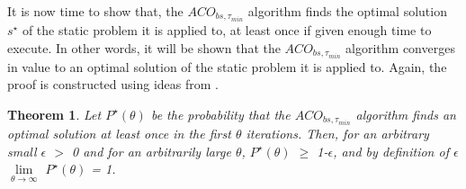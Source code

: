 \documentclass[12pt]{article}
\newtheorem{theorem}[definition]{Theorem}
\numberwithin{equation}{subsection}
\numberwithin{table}{subsection}
\numberwithin{algorithm}{subsection}
\numberwithin{figure}{subsection}
\begin{document}
It is now time to show that, the $ACO_{bs, \tau_{min}}$ algorithm finds the optimal solution $s^\star$ of the static problem it is applied to, at least once if given enough time to execute. In other words, it will be shown that the $ACO_{bs, \tau_{min}}$ algorithm converges in value to an optimal solution of the static problem it is applied to. Again, the proof is constructed using ideas from  \cite{dorigo_stutzle_thomas_2004}.
\begin{theorem}
\label{main_thrm}
Let $P^\star(\theta)$ be the probability that the $ACO_{bs, \tau_{min}}$ algorithm finds an optimal solution at least once in the first $\theta$ iterations. Then, for an arbitrary small $\epsilon$ $>$ 0 and for an arbitrarily large $\theta$, $P^\star(\theta)$ $\geq$ 1-$\epsilon$, and by definition of $\epsilon$ $\lim\limits_{\theta\to\infty}$ $P^\star(\theta)$ = 1. {}
\end{theorem}
\end{document}
